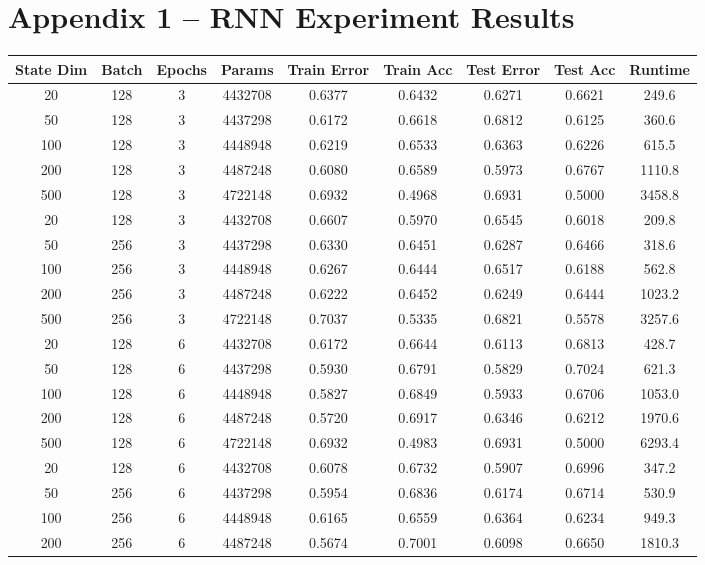 \documentclass[letterpaper, 10pt]{article}
\begin{document}
\newpage

\section{Appendix 1 -- RNN Experiment Results}

\begin{longtable}{c | c | c | c | c | c | c | c | c}
State Dim & Batch & Epochs & Params & Train Error & Train Acc & Test Error & Test Acc & Runtime\\
\hline
\endhead
20 & 128 & 3 & 4432708 & 0.6377 & 0.6432 & 0.6271 & 0.6621 & 249.6 \\
50 & 128 & 3 & 4437298 & 0.6172 & 0.6618 & 0.6812 & 0.6125 & 360.6 \\
100 & 128 & 3 & 4448948 & 0.6219 & 0.6533 & 0.6363 & 0.6226 & 615.5 \\
200 & 128 & 3 & 4487248 & 0.6080 & 0.6589 & 0.5973 & 0.6767 & 1110.8 \\
500 & 128 & 3 & 4722148 & 0.6932 & 0.4968 & 0.6931 & 0.5000 & 3458.8 \\
20 & 128 & 3 & 4432708 & 0.6607 & 0.5970 & 0.6545 & 0.6018 & 209.8 \\
50 & 256 & 3 & 4437298 & 0.6330 & 0.6451 & 0.6287 & 0.6466 & 318.6 \\
100 & 256 & 3 & 4448948 & 0.6267 & 0.6444 & 0.6517 & 0.6188 & 562.8 \\
200 & 256 & 3 & 4487248 & 0.6222 & 0.6452 & 0.6249 & 0.6444 & 1023.2 \\
500 & 256 & 3 & 4722148 & 0.7037 & 0.5335 & 0.6821 & 0.5578 & 3257.6 \\
\hline
20 & 128 & 6 & 4432708 & 0.6172 & 0.6644 & 0.6113 & 0.6813 & 428.7 \\
50 & 128 & 6 & 4437298 & 0.5930 & 0.6791 & 0.5829 & 0.7024 & 621.3 \\
100 & 128 & 6 & 4448948 & 0.5827 & 0.6849 & 0.5933 & 0.6706 & 1053.0 \\
200 & 128 & 6 & 4487248 & 0.5720 & 0.6917 & 0.6346 & 0.6212 & 1970.6 \\
500 & 128 & 6 & 4722148 & 0.6932 & 0.4983 & 0.6931 & 0.5000 & 6293.4 \\
20 & 128 & 6 & 4432708 & 0.6078 & 0.6732 & 0.5907 & 0.6996 & 347.2 \\
50 & 256 & 6 & 4437298 & 0.5954 & 0.6836 & 0.6174 & 0.6714 & 530.9 \\
100 & 256 & 6 & 4448948 & 0.6165 & 0.6559 & 0.6364 & 0.6234 & 949.3 \\
200 & 256 & 6 & 4487248 & 0.5674 & 0.7001 & 0.6098 & 0.6650 & 1810.3 \\

\end{longtable}
\end{document}
